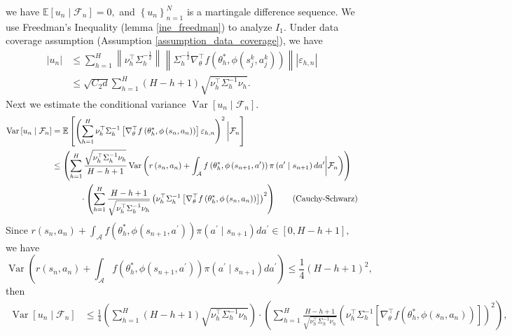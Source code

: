 \documentclass{article}
\numberwithin{equation}{section}
\theoremstyle{plain}
\theoremstyle{definition}
\theoremstyle{remark}
\begin{document}
we have $\mathbb{E}\left[u_n \mid \mathcal{F}_n\right] = 0,$ and $\left\{u_n\right\}_{n=1}^N$ is a martingale difference sequence. We use Freedman's Inequality (lemma \ref{ine_freedman}) to analyze $I_1.$ Under data coverage assumption (Assumption \ref{assumption_data_coverage}), we have
\begin{align*}
    \left|u_n\right| 
    & \leq \sum_{h=1}^H \left\|\nu_h^{\top} \Sigma_h^{-\frac{1}{2}}\right\| \left\|\Sigma_h^{-\frac{1}{2}} \nabla_{\theta}^{\top} f\left(\theta_{h}^*, \phi\left(s_{j}^{k}, a_{j}^{k}\right)\right)\right\| \left|\varepsilon_{h,n}\right|\\
    & \leq \sqrt{C_{2} d} \sum_{h=1}^{H}(H-h+1) \sqrt{\nu_{h}^{\top} \Sigma_{h}^{-1} \nu_{h}}.
\end{align*}
Next we estimate the conditional variance $\operatorname{Var}\left[u_n\mid \mathcal{F}_n\right].$
\begin{align*}
    \operatorname{Var}\left[u_n\mid \mathcal{F}_n\right]
    &= \mathbb{E}\left[\left(\sum_{h=1}^H \nu_{h}^{\top} \Sigma_{h}^{-1}\left[\nabla_{\theta}^{\top} f\left(\theta_{h}^*, \phi\left(s_n, a_n\right)\right)\right] \varepsilon_{h, n}\right)^2 \bigg| \mathcal{F}_n\right] \\
    & \leq \left(\sum_{h=1}^H \frac{\sqrt{\nu_h^{\top}\Sigma_h^{-1} \nu_h}}{H-h+1} \operatorname{Var}\left(r\left(s_{n}, a_{n}\right)+\int_{\mathcal{A}} f\left(\theta_{h}^*, \phi\left(s_{n+1}, a^{\prime}\right)\right) \pi\left(a^{\prime} \mid s_{n+1}\right) d a^{\prime} \bigg| \mathcal{F}_{n}\right)\right)\\
    & \hspace{8ex} \cdot \left(\sum_{h=1}^H \frac{H-h+1}{\sqrt{\nu_h^{\top}\Sigma_h^{-1} \nu_h}} \left(\nu_{h}^{\top} \Sigma_{h}^{-1}\left[\nabla_{\theta}^{\top} f\left(\theta_{h}^*, \phi\left(s_n, a_n\right)\right)\right]\right)^2\right) \tag{Cauchy-Schwarz}
\end{align*}
Since $r\left(s_{n}, a_{n}\right)+\int_{\mathcal{A}} f\left(\theta_{h}^*, \phi\left(s_{n+1}, a^{\prime}\right) \right)\pi\left(a^{\prime} \mid s_{n+1}\right) d a^{\prime} \in [0,H-h+1],$ we have
$$
\operatorname{Var}\left(r\left(s_{n}, a_{n}\right)+\int_{\mathcal{A}} f\left(\theta_{h}^*, \phi\left(s_{n+1}, a^{\prime}\right)\right) \pi\left(a^{\prime} \mid s_{n+1}\right) d a^{\prime} \right) \leq \frac{1}{4}(H-h+1)^2,
$$
then
\begin{align*}
    \operatorname{Var}\left[u_n\mid \mathcal{F}_n\right]
    & \leq \frac{1}{4} \left(\sum_{h=1}^H (H-h+1)\sqrt{\nu_{h}^{\top} \Sigma_{h}^{-1}\nu_{h}}\right)\cdot \left(\sum_{h=1}^H \frac{H-h+1}{\sqrt{\nu_h^{\top}\Sigma_h^{-1} \nu_h}} \left(\nu_{h}^{\top} \Sigma_{h}^{-1}\left[\nabla_{\theta}^{\top} f\left(\theta_{h}^*, \phi\left(s_n, a_n\right)\right)\right]\right)^2\right),
\end{align*}
\end{document}
